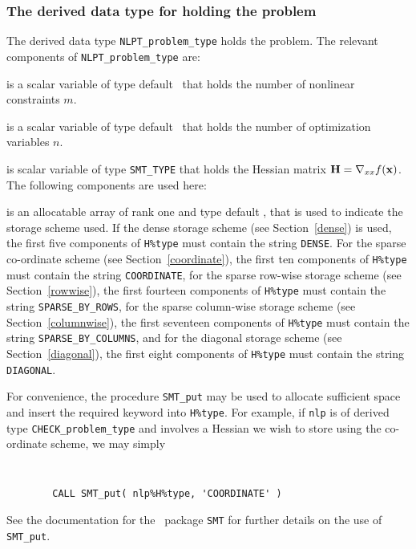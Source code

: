 \documentclass{galahad}
\newcommand{\packagename}{CHECK}
\begin{document}

\subsubsection{The derived data type for holding the problem}\label{typeprob}
The derived data type {\tt NLPT\_problem\_type} holds 
the problem. The relevant components of 
{\tt NLPT\_problem\_type} 
are:

\begin{description}

 is a scalar variable of type default \integer\ 
 that holds the number of nonlinear constraints $m$.  

 is a scalar variable of type default \integer\ 
 that holds the number of optimization variables $n$.  
              
\ittf{H} is scalar variable of type {\tt SMT\_TYPE} 
that holds the Hessian matrix ${\mathbf{H}}=\nabla_{xx}f({\mathbf{x}})$. The following components
are used here:

\begin{description}

 is an allocatable array of rank one and type default 
\character, that
is used to indicate the storage scheme used. If the dense storage scheme 
(see Section~\ref{dense}) is used, 
the first five components of {\tt H\%type} must contain the
string {\tt DENSE}.
For the sparse co-ordinate scheme (see Section~\ref{coordinate}), 
the first ten components of {\tt H\%type} must contain the
string {\tt COORDINATE},  
for the sparse row-wise storage scheme (see Section~\ref{rowwise}),
the first fourteen components of {\tt H\%type} must contain the
string {\tt SPARSE\_BY\_ROWS},
for the sparse column-wise storage scheme (see Section~\ref{columnwise}),
the first seventeen components of {\tt H\%type} must contain the
string {\tt SPARSE\_BY\_COLUMNS},
and for the diagonal storage scheme (see Section~\ref{diagonal}),
the first eight components of {\tt H\%type} must contain the
string {\tt DIAGONAL}.

For convenience, the procedure {\tt SMT\_put} 
may be used to allocate sufficient space and insert the required keyword
into {\tt H\%type}.
For example, if {\tt nlp} is of derived type {\tt \packagename\_problem\_type}
and involves a Hessian we wish to store using the co-ordinate scheme,
we may simply
{\tt 
\begin{verbatim}
        CALL SMT_put( nlp%H%type, 'COORDINATE' )
\end{verbatim}
}
\noindent
See the documentation for the \galahad\ package {\tt SMT} 
for further details on the use of {\tt SMT\_put}.


\end{description}
\end{description}
\end{document}

